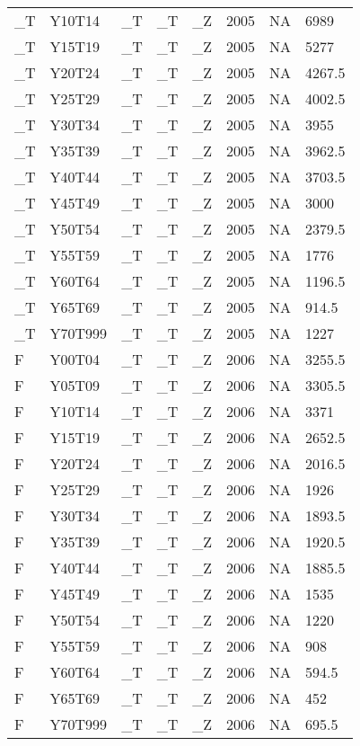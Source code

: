 \begin{longtable}[t]{llllllll}
\_T & Y10T14 & \_T & \_T & \_Z & 2005 & NA & 6989\\
\_T & Y15T19 & \_T & \_T & \_Z & 2005 & NA & 5277\\
\_T & Y20T24 & \_T & \_T & \_Z & 2005 & NA & 4267.5\\
\addlinespace
\_T & Y25T29 & \_T & \_T & \_Z & 2005 & NA & 4002.5\\
\_T & Y30T34 & \_T & \_T & \_Z & 2005 & NA & 3955\\
\_T & Y35T39 & \_T & \_T & \_Z & 2005 & NA & 3962.5\\
\_T & Y40T44 & \_T & \_T & \_Z & 2005 & NA & 3703.5\\
\_T & Y45T49 & \_T & \_T & \_Z & 2005 & NA & 3000\\
\addlinespace
\_T & Y50T54 & \_T & \_T & \_Z & 2005 & NA & 2379.5\\
\_T & Y55T59 & \_T & \_T & \_Z & 2005 & NA & 1776\\
\_T & Y60T64 & \_T & \_T & \_Z & 2005 & NA & 1196.5\\
\_T & Y65T69 & \_T & \_T & \_Z & 2005 & NA & 914.5\\
\_T & Y70T999 & \_T & \_T & \_Z & 2005 & NA & 1227\\
\addlinespace
F & Y00T04 & \_T & \_T & \_Z & 2006 & NA & 3255.5\\
F & Y05T09 & \_T & \_T & \_Z & 2006 & NA & 3305.5\\
F & Y10T14 & \_T & \_T & \_Z & 2006 & NA & 3371\\
F & Y15T19 & \_T & \_T & \_Z & 2006 & NA & 2652.5\\
F & Y20T24 & \_T & \_T & \_Z & 2006 & NA & 2016.5\\
\addlinespace
F & Y25T29 & \_T & \_T & \_Z & 2006 & NA & 1926\\
F & Y30T34 & \_T & \_T & \_Z & 2006 & NA & 1893.5\\
F & Y35T39 & \_T & \_T & \_Z & 2006 & NA & 1920.5\\
F & Y40T44 & \_T & \_T & \_Z & 2006 & NA & 1885.5\\
F & Y45T49 & \_T & \_T & \_Z & 2006 & NA & 1535\\
\addlinespace
F & Y50T54 & \_T & \_T & \_Z & 2006 & NA & 1220\\
F & Y55T59 & \_T & \_T & \_Z & 2006 & NA & 908\\
F & Y60T64 & \_T & \_T & \_Z & 2006 & NA & 594.5\\
F & Y65T69 & \_T & \_T & \_Z & 2006 & NA & 452\\
F & Y70T999 & \_T & \_T & \_Z & 2006 & NA & 695.5\\

\end{longtable}
